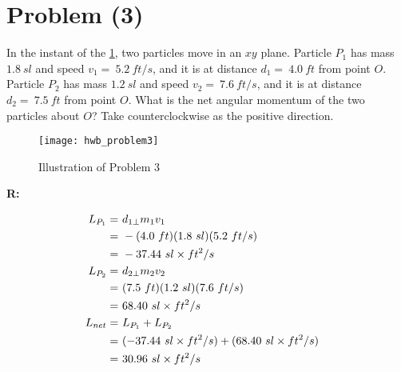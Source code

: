\section{Problem (3)}

	In the instant of the \cref{fig:hwb_problem3}, two particles move in an $xy$ plane. Particle $P_{1}$ has mass $1.8 \ sl$ and speed $v_{1} = \ 5.2 \ ft/s$, and it is at distance $d_{1} = \ 4.0 \ ft$ from point $O$. Particle $P_{2}$ has mass $1.2 \ sl$ and speed $v_{2} = \ 7.6 \ ft/s$, and it is at distance $d_{2} = \ 7.5 \ ft$ from point $O$. What is the net angular momentum of the two particles about $O$? Take counterclockwise as the positive direction.

	\begin{figure}[H]
		\begin{center}
			\texttt{[image: hwb\_problem3]}
			\caption{Illustration of Problem 3}
			\label{fig:hwb_problem3}
		\end{center}
	\end{figure}

	\textbf{R:}

	\begin{align}
		L_{P_{1}} = \ &d_{1\perp}m_{1}v_{1}& \notag \\
		= \ &-(4.0 \ ft)(1.8 \ sl)(5.2 \ ft/s)& \notag \\
		= \ &- 37.44 \ sl \times ft^{2}/s& \notag \\
		L_{P_{2}} = \ &d_{2\perp}m_{2}v_{2}& \notag \\
		= \ &(7.5 \ ft)(1.2 \ sl)(7.6 \ ft/s)& \notag \\
		= \ &68.40 \ sl \times ft^{2}/s& \notag \\
		L_{net} = \ &L_{P_{1}} + L_{P_{2}}& \notag \\
		= \ &(- 37.44 \ sl \times ft^{2}/s) + (68.40 \ sl \times ft^{2}/s)& \notag \\
		= \ &30.96 \ sl \times ft^{2}/s&
	\end{align}
